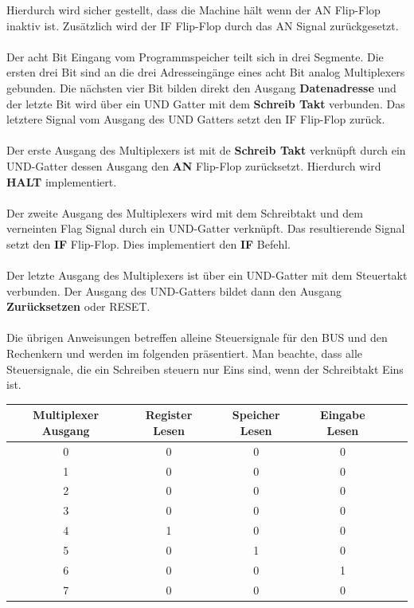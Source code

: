 \documentclass[11pt,a4paper,leqno]{report}
\numberwithin{equation}{chapter}
\begin{document}
Hierdurch wird sicher gestellt, dass die Machine h\"alt wenn der AN Flip-Flop inaktiv ist. Zus\"atzlich wird der IF Flip-Flop durch das AN Signal zur\"uckgesetzt.\\
\\
Der acht Bit Eingang vom Programmspeicher teilt sich in drei Segmente. Die ersten drei Bit sind an die drei Adresseing\"ange eines acht Bit analog Multiplexers gebunden. Die n\"achsten vier Bit bilden direkt den Ausgang \textbf{Datenadresse} und der letzte Bit wird \"uber ein UND Gatter mit dem \textbf{Schreib Takt} verbunden. Das letztere Signal vom Ausgang des UND Gatters setzt den IF Flip-Flop zur\"uck.\\
\\
Der erste Ausgang des Multiplexers ist mit de \textbf{Schreib Takt} verkn\"upft durch ein UND-Gatter dessen Ausgang den \textbf{AN} Flip-Flop zur\"ucksetzt. Hierdurch wird \textbf{HALT} implementiert.\\
\\
Der zweite Ausgang des Multiplexers wird mit dem Schreibtakt und dem verneinten Flag Signal durch ein UND-Gatter verkn\"upft. Das resultierende Signal setzt den \textbf{IF} Flip-Flop. Dies implementiert den \textbf{IF} Befehl.\\
\\
Der letzte Ausgang des Multiplexers ist \"uber ein UND-Gatter mit dem Steuertakt verbunden. Der Ausgang des UND-Gatters bildet dann den Ausgang \textbf{Zur\"ucksetzen} oder RESET.\\
\\
Die \"ubrigen Anweisungen betreffen alleine Steuersignale f\"ur den BUS und den Rechenkern und werden im folgenden pr\"asentiert. Man beachte, dass alle Steuersignale, die ein Schreiben steuern nur Eins sind, wenn der Schreibtakt Eins ist.
\begin{center}
	\begin{tabular}{|c|c|c|c|c|c|}
		\textbf{Multiplexer Ausgang} & Register Lesen & Speicher Lesen & Eingabe Lesen \\
		\hline
		0 & 0 & 0 & 0 \\
		1 & 0 & 0 & 0 \\
		2 & 0 & 0 & 0 \\
		3 & 0 & 0 & 0 \\
		4 & 1 & 0 & 0 \\
		5 & 0 & 1 & 0 \\
		6 & 0 & 0 & 1 \\
		7 & 0 & 0 & 0 \\
	\end{tabular}  
\end{center}
\end{document}
